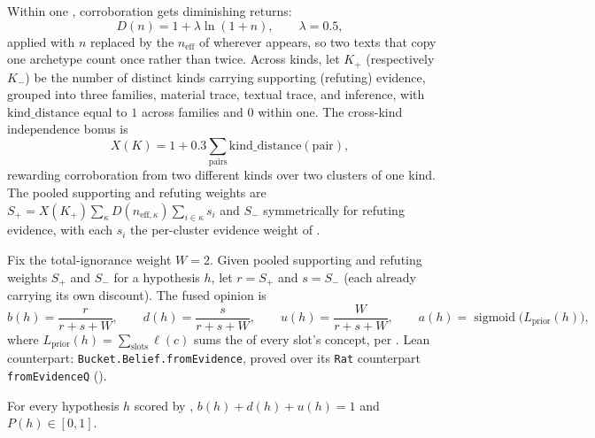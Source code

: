 \documentclass[11pt]{article}
\begin{document}
Within one , corroboration gets diminishing
returns:
\begin{equation}
  \label{eq:diminishing}
  D(n) = 1 + \lambda \ln(1+n), \qquad \lambda = 0.5,
\end{equation}
applied with $n$ replaced by the 
$n_{\mathrm{eff}}$ of  wherever 
appears, so two texts that copy one archetype count once rather than
twice. Across kinds, let $K_{+}$ (respectively $K_{-}$) be the number of
distinct kinds carrying supporting (refuting) evidence, grouped into three
families, material trace, textual trace, and inference, with
$\mathrm{kind\_distance}$ equal to $1$ across families and $0$ within
one. The cross-kind independence bonus is
\begin{equation}
  \label{eq:cross-kind}
  X(K) = 1 + 0.3 \sum_{\mathrm{pairs}} \mathrm{kind\_distance}(\mathrm{pair}),
\end{equation}
rewarding corroboration from two different kinds over two clusters of one
kind. The pooled supporting and refuting weights are
$S_{+} = X(K_{+}) \sum_{\kappa} D(n_{\mathrm{eff},\kappa}) \sum_{i \in
\kappa} s_i$ and $S_{-}$ symmetrically for refuting evidence, with each
$s_i$ the per-cluster evidence weight of .

\begin{definition}
\label{def:opinion-fusion}
Fix the total-ignorance weight $W = 2$. Given pooled supporting and
refuting weights $S_{+}$ and $S_{-}$ for a hypothesis $h$, let
$r = S_{+}$ and $s = S_{-}$ (each already carrying its own
 discount). The fused opinion is
\begin{equation}
  \label{eq:opinion-sum}
  b(h) = \frac{r}{r+s+W}, \qquad
  d(h) = \frac{s}{r+s+W}, \qquad
  u(h) = \frac{W}{r+s+W}, \qquad
  a(h) = \operatorname{sigmoid}\bigl(L_{\mathrm{prior}}(h)\bigr),
\end{equation}
where $L_{\mathrm{prior}}(h) = \sum_{\mathrm{slots}} \ell(c)$ sums the
 of every slot's concept, per
. Lean counterpart: \texttt{Bucket.Belief.fromEvidence},
proved over its \texttt{Rat} counterpart \texttt{fromEvidenceQ}
().
\end{definition}

\begin{lemma}
\label{lem:opinion-sum}
For every hypothesis $h$ scored by ,
$b(h) + d(h) + u(h) = 1$ and $P(h) \in [0,1]$.
\end{lemma}
\end{document}
